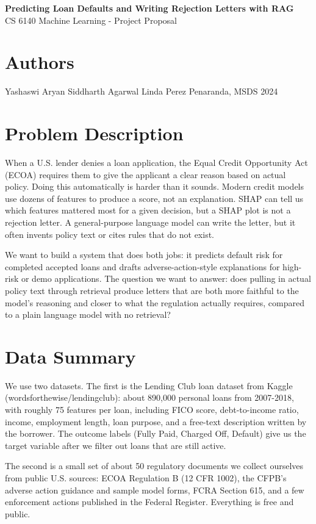 \documentclass[11pt]{article}
\begin{document}
\begin{center}
{\bfseries\large Predicting Loan Defaults and Writing Rejection Letters with RAG}\\
CS 6140 Machine Learning - Project Proposal
\end{center}

\section{Authors}
Yashaswi Aryan \textbar{} Siddharth Agarwal \textbar{} Linda Perez Penaranda, MSDS 2024

\section{Problem Description}
When a U.S. lender denies a loan application, the Equal Credit Opportunity Act (ECOA) requires them to give the applicant a clear reason based on actual policy. Doing this automatically is harder than it sounds. Modern credit models use dozens of features to produce a score, not an explanation. SHAP can tell us which features mattered most for a given decision, but a SHAP plot is not a rejection letter. A general-purpose language model can write the letter, but it often invents policy text or cites rules that do not exist.

We want to build a system that does both jobs: it predicts default risk for completed accepted loans and drafts adverse-action-style explanations for high-risk or demo applications. The question we want to answer: does pulling in actual policy text through retrieval produce letters that are both more faithful to the model's reasoning and closer to what the regulation actually requires, compared to a plain language model with no retrieval?

\section{Data Summary}
We use two datasets. The first is the Lending Club loan dataset from Kaggle (wordsforthewise/lendingclub): about 890,000 personal loans from 2007-2018, with roughly 75 features per loan, including FICO score, debt-to-income ratio, income, employment length, loan purpose, and a free-text description written by the borrower. The outcome labels (Fully Paid, Charged Off, Default) give us the target variable after we filter out loans that are still active.

The second is a small set of about 50 regulatory documents we collect ourselves from public U.S. sources: ECOA Regulation B (12 CFR 1002), the CFPB's adverse action guidance and sample model forms, FCRA Section 615, and a few enforcement actions published in the Federal Register. Everything is free and public.
\end{document}
